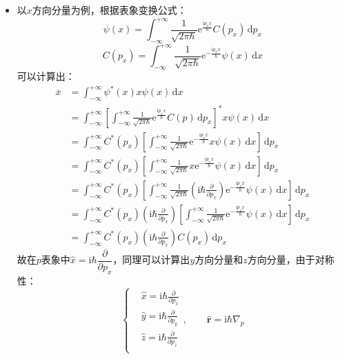 \documentclass[a4paper,fontset=none]{ctexart}
\begin{document}
\begin{itemize}
        \item[1.23]
        以$x$方向分量为例，根据表象变换公式：
        \[
        \psi(x) = \int_{-\infty}^{+\infty}\frac{1}{\sqrt{2\pi\hbar}}\mathrm{e}^{\tfrac{\mathrm{i}p_x x}{\hbar}}C(p_x)\,\mathrm{d}p_x
        \]
        \[
        C(p_x) = \int_{-\infty}^{+\infty}\frac{1}{\sqrt{2\pi\hbar}}\mathrm{e}^{-\tfrac{\mathrm{i}p_x x}{\hbar}}\psi(x)\,\mathrm{d}x
        \]
        可以计算出：
        \begin{align*}
            \overline{x}
            &= \int_{-\infty}^{+\infty}\psi^*(x)x\psi(x)\,\mathrm{d}x \\
            &= \int_{-\infty}^{+\infty}\left[\int_{-\infty}^{+\infty}\frac{1}{\sqrt{2\pi\hbar}}\mathrm{e}^{\tfrac{\mathrm{i}p_x x}{\hbar}}C(p)\,\mathrm{d}p_x\right]^* x\psi(x)\,\mathrm{d}x \\
            &= \int_{-\infty}^{+\infty}C^*(p_x)\left[\int_{-\infty}^{+\infty}\frac{1}{\sqrt{2\pi\hbar}}\mathrm{e}^{-\tfrac{\mathrm{i}p_x x}{\hbar}}x\psi(x)\,\mathrm{d}x\right]\,\mathrm{d}p_x \\
            &= \int_{-\infty}^{+\infty}C^*(p_x)\left[\int_{-\infty}^{+\infty}\frac{1}{\sqrt{2\pi\hbar}}x\mathrm{e}^{-\tfrac{\mathrm{i}p_x x}{\hbar}}\psi(x)\,\mathrm{d}x\right]\,\mathrm{d}p_x \\
            &= \int_{-\infty}^{+\infty}C^*(p_x)\left[\int_{-\infty}^{+\infty}\frac{1}{\sqrt{2\pi\hbar}}\left(\mathrm{i}\hbar\frac{\partial}{\partial p_x}\right)\mathrm{e}^{-\tfrac{\mathrm{i}p_x x}{\hbar}}\psi(x)\,\mathrm{d}x\right]\,\mathrm{d}p_x \\
            &= \int_{-\infty}^{+\infty}C^*(p_x)\left(\mathrm{i}\hbar\frac{\partial}{\partial p_x}\right)\left[\int_{-\infty}^{+\infty}\frac{1}{\sqrt{2\pi\hbar}}\mathrm{e}^{-\tfrac{\mathrm{i}p_x x}{\hbar}}\psi(x)\,\mathrm{d}x\right]\,\mathrm{d}p_x \\
            &= \int_{-\infty}^{+\infty}C^*(p_x)\left(\mathrm{i}\hbar\frac{\partial}{\partial p_x}\right)C(p_x)\,\mathrm{d}p_x
        \end{align*}
        故在$p$表象中$\hat{x} = \mathrm{i}\hbar\dfrac{\partial}{\partial p_x}$，同理可以计算出$y$方向分量和$z$方向分量，由于对称性：
        \[
        \left\{
        \begin{aligned}
            &\hat{x} = \mathrm{i}\hbar\frac{\partial}{\partial p_x} \\
            &\hat{y} = \mathrm{i}\hbar\frac{\partial}{\partial p_y} \\
            &\hat{z} = \mathrm{i}\hbar\frac{\partial}{\partial p_z} \\
        \end{aligned}
        \right.,\qquad
        \hat{\bm{r}} = \mathrm{i}\hbar\nabla_p
        \]


\end{itemize}
\end{document}
